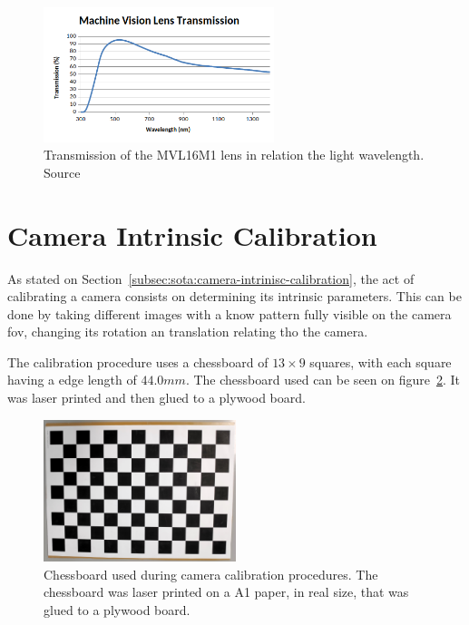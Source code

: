 \begin{figure}[H]
	\centering
	\includegraphics[width=0.6\textwidth]{img/experimental-setup/lens-transmission.png}
	\caption{Transmission of the MVL16M1 lens in relation the light wavelength. Source~\cite{Thorlabs}}
	\label{fig:lens-transmission}
\end{figure}



\section{Camera Intrinsic Calibration}
As stated on Section~\ref{subsec:sota:camera-intrinisc-calibration}, the act of calibrating a camera consists on determining its intrinsic parameters. This can be done by taking different images with a know pattern fully visible on the camera \ac{fov}, changing its rotation an translation relating tho the camera.

The calibration procedure uses a chessboard of $13 \times 9$ squares, with each square having a edge length of $44.0mm$. The chessboard used can be seen on figure~\ref{fig:chessboard}. It was laser printed and then glued to a plywood board.

\begin{figure}[H]
	\centering
	\includegraphics[width=0.5\textwidth]{img/experimental-setup/chessboard.jpg}
	\caption{Chessboard used during camera calibration procedures. The chessboard was laser printed on a A1 paper, in real size, that was glued to a plywood board.}
	\label{fig:chessboard}
\end{figure}


